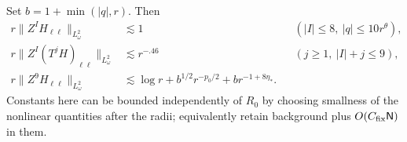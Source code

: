 \begin{lemma}\label{fe:tight-projection}
Set $b=1+\min(|q|,r)$.  Then
\begin{equation}\label{fe:F10}
\begin{aligned}
    r\|Z^I H_{\ell\ell}\|_{L^2_\omega} &\lesssim 1
                   &&(|I|\le8,\ |q|\le 10 r^\theta),\\
    r\|Z^I (T^j H)_{\ell\ell}\|_{L^2_\omega} &\lesssim r^{-.46}
                   &&(j\ge1,\ |I|+j\le9),\\
    r\|Z^9 H_{\ell\ell}\|_{L^2_\omega}
       &\lesssim \log r + b^{1/2}r^{-p_0/2}+b r^{-1+8\eta_*}.
 \end{aligned}
\end{equation}
Constants here can be bounded independently of \(R_0\) by choosing smallness of the nonlinear quantities after the radii; equivalently retain background plus \(O(C_{\rm fix}\mathsf N)\) in them.
\end{lemma}

